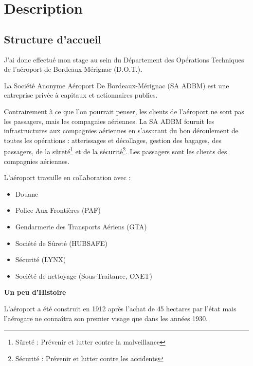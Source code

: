 \chapter{Description}

\section{Structure d'accueil}

J’ai donc effectué mon stage au sein du Département des Opérations Techniques de l’aéroport de Bordeaux-Mérignac (D.O.T.).

La Société Anonyme Aéroport De Bordeaux-Mérignac (SA ADBM) est une entreprise privée à capitaux et actionnaires publics.\newline

Contrairement à ce que l’on pourrait penser, les clients de l’aéroport ne sont pas les passagers, mais les compagnies aériennes. La SA ADBM fournit les infrastructures aux compagnies aériennes en s’assurant du bon déroulement de toutes les opérations : atterissages et décollages, gestion des bagages, des passagers, de la sûreté\footnote{Sûreté : Prévenir et lutter contre la malveillance} et de la sécurité\footnote{Sécurité : Prévenir et lutter contre les accidents}. Les passagers sont les clients des compagnies aériennes.\newline

L’aéroport travaille en collaboration avec :


\begin{itemize}
  \item Douane
  \item Police Aux Frontières (PAF)
  \item Gendarmerie des Transports Aériens (GTA)
  \item Société de Sûreté (HUBSAFE)
  \item Sécurité (LYNX)
  \item Société de nettoyage (Sous-Traitance, ONET)\newline
\end{itemize}


\textbf{Un peu d'Histoire}\newline

L'aéroport a été construit en 1912 après l'achat de 45 hectares par l'état mais l'aérogare ne connaîtra son premier visage que dans les années 1930.

